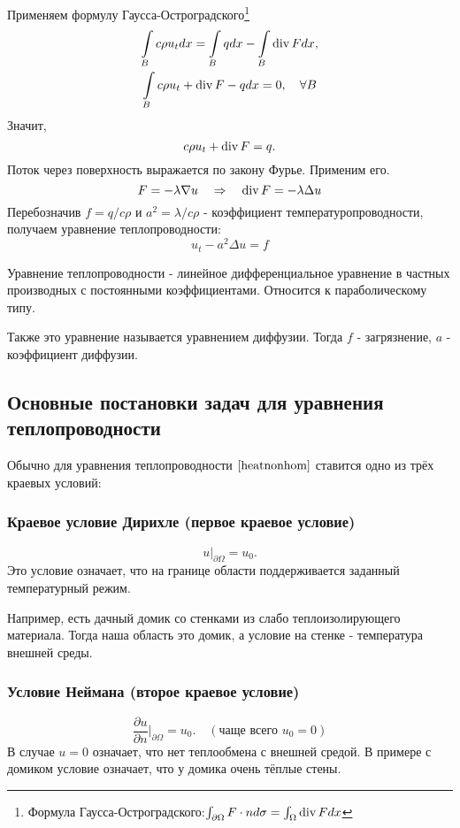 Применяем формулу Гаусса-Остроградского\footnote{Формула Гаусса-Остроградского:$
    \int_{\partial \Omega} F \cdot n d\sigma = \int_{\Omega} \operatorname{div} F dx$}
\begin{gather*}
    \int \limits_B c \rho u_t dx = \int \limits_B q dx - \int \limits_B \operatorname{div} F dx, \\
    \int \limits_B c \rho u_t + \operatorname{div} F - q dx = 0,\quad \forall B
\end{gather*}
Значит,
$$ c \rho u_t + \operatorname{div} F = q.$$
Поток через поверхность выражается по закону Фурье. Применим его.
$$ F = - \lambda \nabla u \quad \Rightarrow \quad \operatorname{div} F = - \lambda \Delta u$$
Перебозначив $f = q/c\rho$ и $ a^2 = \lambda / c \rho $ - коэффициент температуропроводности, получаем уравнение теплопроводности:
\begin{equation}
	u_t - a^2 \Delta u = f
\label{heatnonhom}
\end{equation}

Уравнение теплопроводности - линейное дифференциальное уравнение в частных производных с постоянными коэффициентами. Относится к параболическому типу.

Также это уравнение называется уравнением диффузии. Тогда $f$ - загрязнение, $a$ - коэффициент диффузии.

\subsection{Основные постановки задач для уравнения теплопроводности}
Обычно для уравнения теплопроводности $\eqref{heatnonhom}$ ставится одно из трёх краевых условий:

\subsubsection{Краевое условие Дирихле (первое краевое условие)}
$$u \Bigg \rvert_{\partial\Omega} = u_0.$$
Это условие означает, что на границе области поддерживается заданный температурный режим.

Например, есть дачный домик со стенками из слабо теплоизолирующего материала. Тогда наша область это домик, а условие на стенке - температура внешней среды.

\subsubsection{Условие Неймана (второе краевое условие)}
$$\dfrac{\partial u}{\partial n}\Bigg\rvert_{\partial\Omega} = u_0.\quad (\text{чаще всего }u_0 = 0)$$
В случае $u = 0$ означает, что нет теплообмена с внешней средой. В примере с домиком условие означает, что у домика очень тёплые стены.

